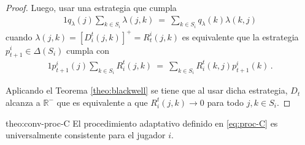 \begin{proof}
Luego, usar una estrategia que cumpla
\begin{alignat}{1}
	q_{\lambda}(j) \sum_{k \in S_i} \lambda(j, k)\ =\  \sum_{k \in S_i} q_{\lambda}(k) \lambda(k, j)
\end{alignat}
cuando $\lambda(j, k) = [D_i^t(j, k)]^+ = R_t^i(j, k)$ es equivalente que la estrategia $p_{t+1}^i \in \Delta(S_i)$ cumpla con
\begin{alignat}{1}
	p_{t+1}^i (j) \sum_{k \in S_i} R_i^t(j, k)\ =\ \sum_{k \in S_i} R_i^t(k, j) p_{t+1}^i(k) \,.
\end{alignat}

Aplicando el Teorema \ref{theo:blackwell} se tiene que al usar dicha estrategia, $D_t$ alcanza a $\mathbb{R}^-$ que es equivalente a que $R_i^t(j, k) \rightarrow 0$ para todo $j, k \in S_i$.
\end{proof}

\begin{reptheorem}{theo:conv-proc-C}
El procedimiento adaptativo definido en \eqref{eq:proc-C} es universalmente consistente para el jugador $i$.
\end{reptheorem}

